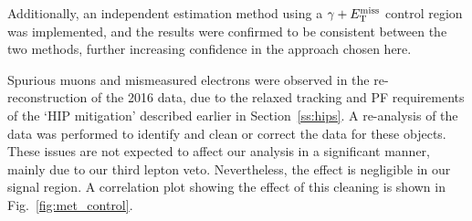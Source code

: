 Additionally, an independent estimation method using a $\gamma+E_\mathrm{T}^{\mathrm{miss}}$ control region was implemented, and the results were 
confirmed to be consistent between the two methods, further increasing confidence in the approach chosen here.

Spurious muons and mismeasured electrons were observed in the re-reconstruction of the 2016 data, due to the relaxed tracking and PF requirements of the `HIP mitigation'
described earlier in Section~\ref{ss:hips}. 
A re-analysis of the data was performed to identify and clean or correct the data for these objects.
These issues are not expected to affect our analysis in a significant manner, mainly due to our third lepton veto.
Nevertheless, the effect is negligible in our signal region. 
A correlation plot showing the effect of this cleaning is shown in Fig.~\ref{fig:met_control}.

